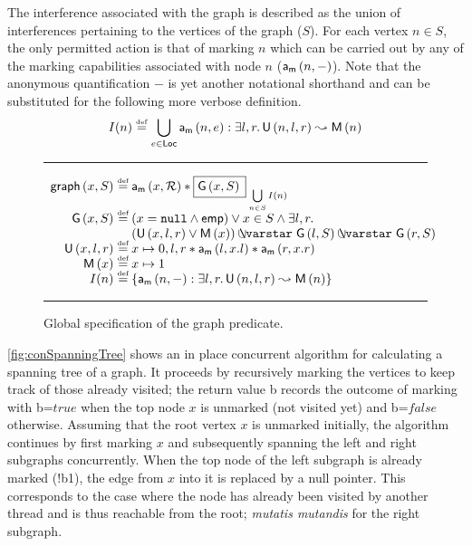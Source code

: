 The interference associated with the graph is described as the union of interferences pertaining to the vertices of the graph ($S$). For each vertex $n \in S$, the only permitted action is that of marking $n$ which can be carried out by any of the marking capabilities associated with node $n$ ($\mathsf{a}_{\textsf{m}}\left(n, -\right)$). Note that the anonymous quantification $-$ is yet another notational shorthand and can be substituted for the following more verbose definition.
%
\[
I(n) \mathrel{\stackrel{\smash{\scriptscriptstyle{\mathrm{def}}}}{=}} \bigcup\limits_{e \in \textsf{Loc}} \mathsf{a}_{\textsf{m}}\left(n, e\right) : \exists l, r.\, \textsf{U}\left(n, l, r\right) \mathrel{\leadsto} \textsf{M}\left(n\right) 
\]
%
%
\begin{figure}
%
\hrule
\[
\begin{array}{r @{\hspace*{2pt}} l}
	\graph{x}{S} \eqdef & \markT{x}{\rootEdge} * \shared{\G{x}{S}}{\bigcup\limits_{n \in S}I(n)}\\
%	
	\G{x}{S} \eqdef & (x = \nil \land \emp) \lor x \in S \land \exsts{l, r}\\
	& \left( \unmarked{x}{l}{r} \lor \marked{x}\right) \sepish \G{l}{S} \sepish \G{r}{S}\\
%
	\unmarked{x}{l}{r} \eqdef & \cell{x}{0, l, r} * \markT{l}{x.l} * \markT{r}{x.r}\\
%	
	\marked{x} \eqdef & \cell{x}{1}\\
%
	I(n) \eqdef & \left\{ \markT{n}{-}: \exsts{l, r} \unmarked{n}{l}{r} \swap \marked{n}\right\}\\
%
\end{array}
\]
%
\hrule
\caption{Global specification of the graph predicate.}
\label{fig:globalCST}
\end{figure}
%
%
\fig\ref{fig:conSpanningTree} shows an in place concurrent algorithm for calculating a spanning tree of a graph. It proceeds by recursively marking the vertices to keep track of those already visited; the return value b records the outcome of marking with b=$true$ when the top node $x$ is unmarked (not visited yet) and b=$false$ otherwise. Assuming that the root vertex $x$ is unmarked initially, the algorithm continues by first marking $x$ and subsequently spanning the left and right subgraphs concurrently. When the top node of the left subgraph is already marked (!b1), the edge from $x$ into it is replaced by a null pointer. This corresponds to the case where the node has already been visited by another thread and is thus reachable from the root; \emph{mutatis mutandis} for the right subgraph.
